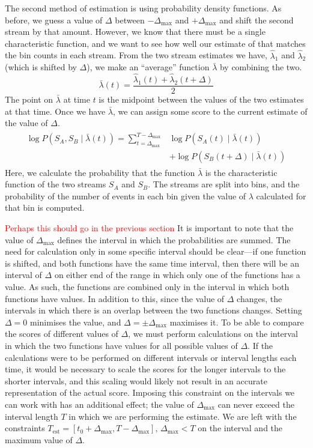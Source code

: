 \documentclass[a4paper,11pt]{article}
\begin{document}
The second method of estimation is using probability density functions. As
before, we guess a value of $\Delta$ between $-\Delta_{\text{max}}$ and
$+\Delta_{\text{max}}$ and shift the second stream by that amount. However, we
know that there must be a single characteristic function, and we want to see how
well our estimate of that matches the bin counts in each stream. From the two
stream estimates we have, $\hat{\lambda}_1$ and $\hat{\lambda}_2$ (which is
shifted by $\Delta$), we make an ``average'' function $\bar{\lambda}$ by combining the
two.
\begin{equation}
\bar{\lambda}(t)=\frac{\hat{\lambda}_1(t)+\hat{\lambda}_2(t+\Delta)}{2}
\end{equation}
The point on $\bar{\lambda}$ at time $t$ is the midpoint between the values of
the two estimates at that time. Once we have $\bar{\lambda}$, we can assign some
score to the current estimate of the value of $\Delta$.
\begin{align}
\begin{split}
\log P(S_A,S_B\mid\bar{\lambda}(t))=\sum_{t=\Delta_{\text{max}}}^{T-\Delta_{\text{max}}}&\log P(S_A(t)\mid \bar{\lambda}(t))\\
&+ \log P(S_B(t+\Delta)\mid \bar{\lambda}(t))
\end{split}
\end{align}
Here, we calculate the probability that the function $\bar{\lambda}$ is the
characteristic function of the two streams $S_A$ and $S_B$. The streams are
split into bins, and the probability of the number of events in each bin given
the value of $\lambda$ calculated for that bin is computed. 

\textcolor{red}{Perhaps this should go in the previous section} It is important
to note that the value of $\Delta_{\text{max}}$ defines the interval in which
the probabilities are summed. The need for calculation only in some specific
interval should be clear---if one function is shifted, and both functions have
the same time interval, then there will be an interval of $\Delta$ on either end
of the range in which only one of the functions has a value. As such, the
functions are combined only in the interval in which both functions have
values. In addition to this, since the value of $\Delta$ changes, the intervals
in which there is an overlap between the two functions changes. Setting
$\Delta=0$ minimises the value, and $\Delta=\pm\Delta_{\text{max}}$ maximises
it. To be able to compare the scores of different values of $\Delta$, we must
perform calculations on the interval in which the two functions have values for
all possible values of $\Delta$. If the calculations were to be performed on
different intervals or interval lengths each time, it would be necessary to
scale the scores for the longer intervals to the shorter intervals, and this
scaling would likely not result in an accurate representation of the actual
score. Imposing this constraint on the intervals we can work with has an
additional effect; the value of $\Delta_{\text{max}}$ can never exceed the
interval length $T$ in which we are performing the estimate. We are left with
the constraints $T_{\text{est}}=[t_0+\Delta_{\text{max}},
T-\Delta_{\text{max}}],\,\Delta_{\text{max}}<T$ on the interval and the maximum
value of $\Delta$.
\end{document}
